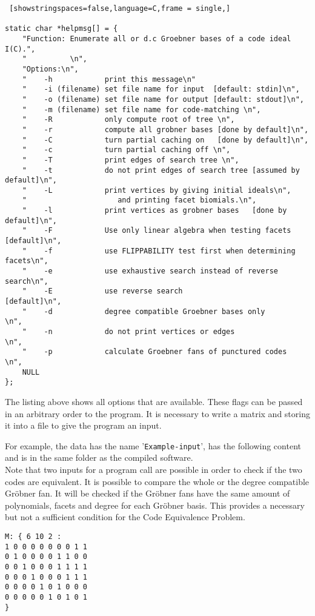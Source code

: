 \begin{lstlisting} [showstringspaces=false,language=C,frame = single,]

static char *helpmsg[] = {
    "Function: Enumerate all or d.c Groebner bases of a code ideal I(C).",
    "          \n",
    "Options:\n",
    "    -h            print this message\n"
    "    -i (filename) set file name for input  [default: stdin]\n",
    "    -o (filename) set file name for output [default: stdout]\n",
    "    -m (filename) set file name for code-matching \n",
    "    -R            only compute root of tree \n",
    "    -r            compute all grobner bases [done by default]\n",
    "    -C            turn partial caching on   [done by default]\n",
    "    -c            turn partial caching off \n",
    "    -T            print edges of search tree \n",
    "    -t            do not print edges of search tree [assumed by default]\n",  
    "    -L            print vertices by giving initial ideals\n",
    "                     and printing facet biomials.\n",
    "    -l            print vertices as grobner bases   [done by default]\n",
    "    -F            Use only linear algebra when testing facets [default]\n",
    "    -f            use FLIPPABILITY test first when determining facets\n",
    "    -e            use exhaustive search instead of reverse search\n",
    "    -E            use reverse search                   [default]\n",
    "    -d            degree compatible Groebner bases only         \n",
    "    -n            do not print vertices or edges                \n",
    "    -p            calculate Groebner fans of punctured codes    \n",
    NULL
};

\end{lstlisting}

The listing above shows all options that are available. These flags can be passed in an arbitrary order to the program. It is necessary to write a matrix and storing it into a file to give the program an input.

For example, the data has the name '\texttt{Example-input}', has the following content and is in the same folder as the compiled software.\\
Note that two inputs for a program call are possible in order to check if the two codes are equivalent. It is possible to compare the whole or the degree compatible Gröbner fan. It will be checked if the Gröbner fans have the same amount of polynomials, facets and degree for each Gröbner basis. This provides a necessary but not a sufficient condition for the Code Equivalence Problem. 
\begin{lstlisting}[basicstyle=\fontfamily{courier}\selectfont]
M: { 6 10 2 :
1 0 0 0 0 0 0 0 1 1 
0 1 0 0 0 0 1 1 0 0 
0 0 1 0 0 0 1 1 1 1 
0 0 0 1 0 0 0 1 1 1 
0 0 0 0 1 0 1 0 0 0 
0 0 0 0 0 1 0 1 0 1 
}
\end{lstlisting}

